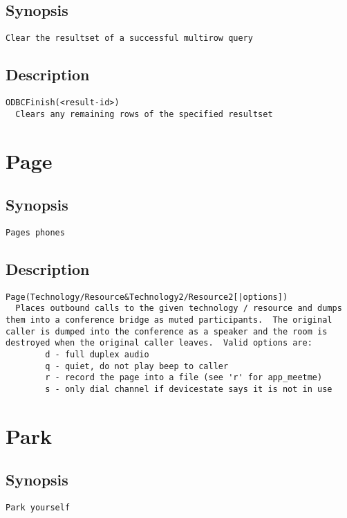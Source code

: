 \subsection{Synopsis}
\begin{verbatim}
Clear the resultset of a successful multirow query
\end{verbatim}
\subsection{Description}
\begin{verbatim}
ODBCFinish(<result-id>)
  Clears any remaining rows of the specified resultset

\end{verbatim}


\section{Page}
\subsection{Synopsis}
\begin{verbatim}
Pages phones
\end{verbatim}
\subsection{Description}
\begin{verbatim}
Page(Technology/Resource&Technology2/Resource2[|options])
  Places outbound calls to the given technology / resource and dumps
them into a conference bridge as muted participants.  The original
caller is dumped into the conference as a speaker and the room is
destroyed when the original caller leaves.  Valid options are:
        d - full duplex audio
        q - quiet, do not play beep to caller
        r - record the page into a file (see 'r' for app_meetme)
        s - only dial channel if devicestate says it is not in use

\end{verbatim}


\section{Park}
\subsection{Synopsis}
\begin{verbatim}
Park yourself
\end{verbatim}
